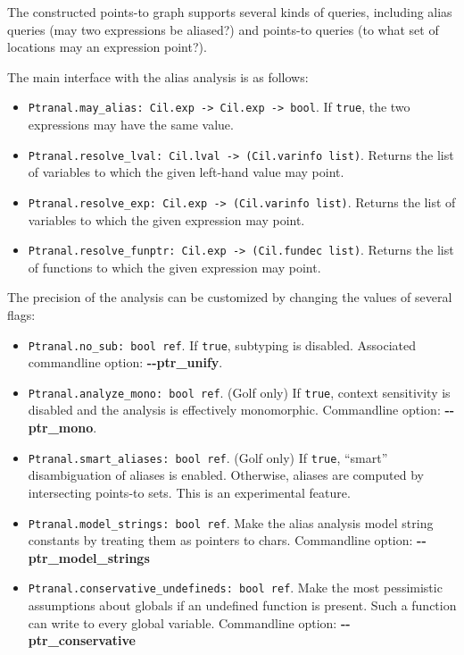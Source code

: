 \documentclass{article}
\def\t#1{{\tt #1}}
\begin{document}
The constructed points-to graph supports several kinds of queries,
including alias queries (may two expressions be aliased?) and
points-to queries (to what set of locations may an expression point?).

The main interface with the alias analysis is as follows:
\begin{itemize}
\item \t{Ptranal.may\_alias: Cil.exp -> Cil.exp -> bool}. If
  \t{true}, the two expressions may have the same value.
\item \t{Ptranal.resolve\_lval: Cil.lval -> (Cil.varinfo
    list)}.  Returns the list of variables to which the given
  left-hand value may point.
\item \t{Ptranal.resolve\_exp: Cil.exp -> (Cil.varinfo list)}.
  Returns the list of variables to which the given expression may
  point.
\item \t{Ptranal.resolve\_funptr: Cil.exp -> (Cil.fundec
    list)}. Returns the list of functions to which the given
  expression may point.
\end{itemize}

The precision of the analysis can be customized by changing the values
of several flags:

\begin{itemize}
\item \t{Ptranal.no\_sub: bool ref}.
  If \t{true}, subtyping is disabled.  Associated commandline option:
  {\bf -{}-ptr\_unify}.
\item \t{Ptranal.analyze\_mono: bool ref}.
  (Golf only) If \t{true}, context sensitivity is disabled and the
  analysis is effectively monomorphic.  Commandline option:
  {\bf -{}-ptr\_mono}.
\item \t{Ptranal.smart\_aliases: bool ref}.
  (Golf only) If \t{true}, ``smart'' disambiguation of aliases is
  enabled.  Otherwise, aliases are computed by intersecting points-to
  sets.  This is an experimental feature.
\item \t{Ptranal.model\_strings: bool ref}.
  Make the alias analysis model string constants by treating them as
  pointers to chars.  Commandline option: {\bf -{}-ptr\_model\_strings}
\item \t{Ptranal.conservative\_undefineds: bool ref}.
  Make the most pessimistic assumptions about globals if an undefined
  function is present.  Such a function can write to every global
  variable.  Commandline option: {\bf -{}-ptr\_conservative}
\end{itemize}
\end{document}
